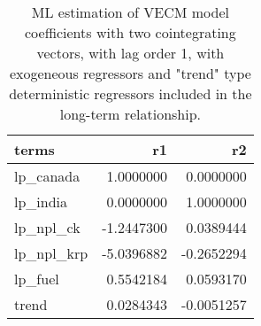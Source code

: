 \documentclass[
  12pt,
]{article}
\begin{document}
\begin{table}

\caption{\label{tab:wheat-cajo-test-withex-vecm}ML estimation of VECM model coefficients with two cointegrating vectors, with lag order 1, with exogeneous regressors and "trend" type deterministic regressors included in the long-term relationship.}
\centering
\begin{tabular}[t]{lrr}
\toprule
terms & r1 & r2\\
\midrule
lp\_canada & 1.0000000 & 0.0000000\\
lp\_india & 0.0000000 & 1.0000000\\
lp\_npl\_ck & -1.2447300 & 0.0389444\\
lp\_npl\_krp & -5.0396882 & -0.2652294\\
lp\_fuel & 0.5542184 & 0.0593170\\
\addlinespace
trend & 0.0284343 & -0.0051257\\
\bottomrule
\end{tabular}
\end{table}
\end{document}
